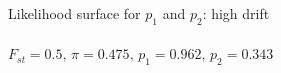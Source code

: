 \documentclass[presentation,sansserif]{beamer}
\begin{document}
{  %
\begin{frame}[c,plain]{Likelihood surface for $p_1$ and $p_2$: high drift}
	\framesubtitle{$F_{st}=0.5,\, \pi=0.475,\, p_1=0.962,\, p_2=0.343$}
	\begin{center}
	\end{center}
\end{frame}
}

\end{document}
